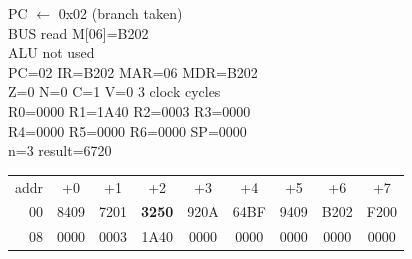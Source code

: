 \begin{tcolorbox}[stepbox, title={Step 27 \hfill PC 06 \quad BNE loop}]
PC $\leftarrow$ 0x02 (branch taken)\\
\textcolor{dim}{BUS} read M[06]=B202\\
\textcolor{dim}{ALU} \textcolor{dim}{not used}\\
PC=02 IR=B202 MAR=06 MDR=B202\\
Z=0 N=0 C=1 V=0 \hfill \textcolor{dim}{3 clock cycles}\\
R0=0000 R1=1A40 R2=0003 R3=0000\\
R4=0000 R5=0000 R6=0000 SP=0000\\
\textcolor{dim}{n=3  result=6720}\\[1pt]
{\setlength{\tabcolsep}{1.6pt}\begin{tabular}{@{}r*{8}{c}@{}}
\textcolor{dim}{addr} & \textcolor{dim}{+0} & \textcolor{dim}{+1} & \textcolor{dim}{+2} & \textcolor{dim}{+3} & \textcolor{dim}{+4} & \textcolor{dim}{+5} & \textcolor{dim}{+6} & \textcolor{dim}{+7}\\
\textcolor{dim}{00} & 8409 & 7201 & \cellcolor{pcc}\textbf{3250} & 920A & 64BF & 9409 & B202 & F200\\
\textcolor{dim}{08} & 0000 & \cellcolor{datac}0003 & \cellcolor{datac}1A40 & 0000 & 0000 & 0000 & 0000 & 0000\\
\end{tabular}}
\end{tcolorbox}\par\vspace{3pt}
